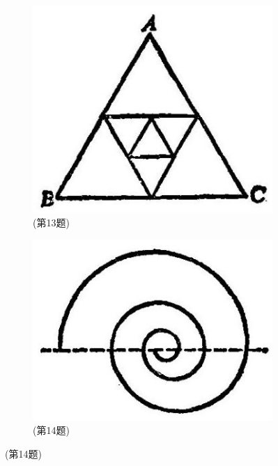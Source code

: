 \documentclass[lang=cn,newtx,12pt,scheme=chinese]{elegantbook}
\begin{document}
\begin{problemset}[习题一]
	\begin{figure}[h]
		\centering
		\begin{subfigure}[h]{0.45\textwidth}
			\centering
			\includegraphics[max width=\textwidth]{images/01912c18-5c3f-733d-b775-749ba9897a9d_20_529798.jpg}
			\caption{(第13题)}
		\end{subfigure}
		\hfill %
		\begin{subfigure}[h]{0.45\textwidth}
			\centering
			\includegraphics[max width=\textwidth]{images/01912c18-5c3f-733d-b775-749ba9897a9d_20_500122.jpg}
			\caption{	(第14题)}
		\end{subfigure}
	\end{figure}
	

\end{problemset}
\end{document}
